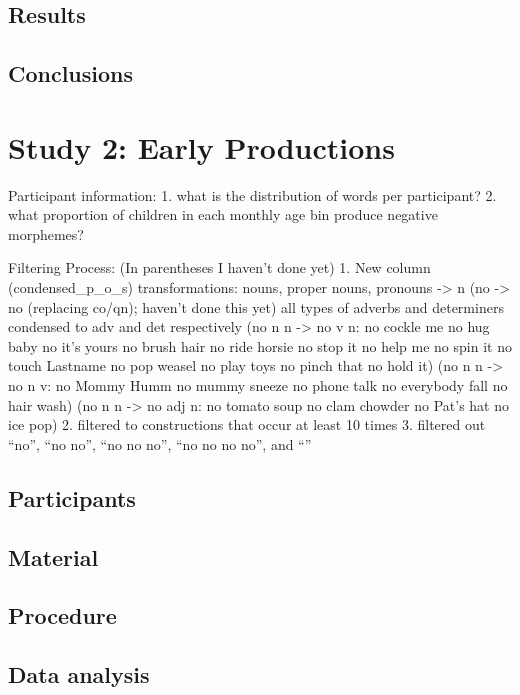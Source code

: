 \documentclass[man,floatsintext,draftall]{apa6}
\begin{document}
\subsection{Results}\label{results}

\subsection{Conclusions}\label{conclusions}

\section{Study 2: Early Productions}\label{study-2-early-productions}

Participant information: 1. what is the distribution of words per
participant? 2. what proportion of children in each monthly age bin
produce negative morphemes?

Filtering Process: (In parentheses I haven't done yet) 1. New column
(condensed\_p\_o\_s) transformations: nouns, proper nouns, pronouns
-\textgreater{} n (no -\textgreater{} no (replacing co/qn); haven't done
this yet) all types of adverbs and determiners condensed to adv and det
respectively (no n n -\textgreater{} no v n: no cockle me no hug baby no
it's yours no brush hair no ride horsie no stop it no help me no spin it
no touch Lastname no pop weasel no play toys no pinch that no hold it)
(no n n -\textgreater{} no n v: no Mommy Humm no mummy sneeze no phone
talk no everybody fall no hair wash) (no n n -\textgreater{} no adj n:
no tomato soup no clam chowder no Pat's hat no ice pop) 2. filtered to
constructions that occur at least 10 times 3. filtered out \enquote{no},
\enquote{no no}, \enquote{no no no}, \enquote{no no no no}, and
\enquote{}

\subsection{Participants}\label{participants}

\subsection{Material}\label{material}

\subsection{Procedure}\label{procedure-1}

\subsection{Data analysis}\label{data-analysis}
\end{document}
